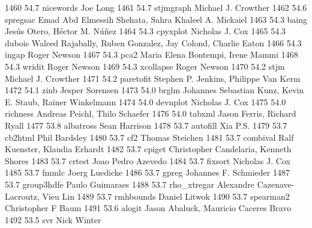   1460     54.7    nicewords     Joe Long                                
  1461     54.7    stjmgraph     Michael J. Crowther                     
  1462     54.6    spregsac      Emad Abd Elmessih Shehata, Sahra        
                                   Khaleel A. Mickaiel                     
  1463     54.3    baing         Jesús Otero, Héctor M. Núñez        
  1464     54.3    cpyxplot      Nicholas J. Cox                         
  1465     54.3    dubois        Waleed Rajabally, Ruben Gonzalez, Jay   
                                   Colond, Charlie Eaton                   
  1466     54.3    ingap         Roger Newson                            
  1467     54.3    pca2          Maria Elena Bontempi, Irene Mammi       
  1468     54.3    wridit        Roger Newson                            
  1469     54.3    xcollapse     Roger Newson                            
  1470     54.2    stjm          Michael J. Crowther                     
  1471     54.2    paretofit     Stephen P. Jenkins, Philippe Van Kerm   
  1472     54.1    zinb          Jesper Sorensen                         
  1473     54.0    brglm         Johannes Sebastian Kunz, Kevin E.       
                                   Staub, Rainer Winkelmann                
  1474     54.0    devnplot      Nicholas J. Cox                         
  1475     54.0    richness      Andreas Peichl, Thilo Schaefer          
  1476     54.0    tabxml        Jason Ferris, Richard Ryall             
  1477     53.8    albatross     Sean Harrison                           
  1478     53.7    autofill      Xia P.S.                                
  1479     53.7    cb2html       Phil Bardsley                           
  1480     53.7    cf2           Thomas Steichen                         
  1481     53.7    combival      Ralf Kuenster, Klaudia Erhardt          
  1482     53.7    cpiget        Christopher Candelaria, Kenneth Shores  
  1483     53.7    crtest        Joao Pedro Azevedo                      
  1484     53.7    fixsort       Nicholas J. Cox                         
  1485     53.7    fmmlc         Joerg Luedicke                          
  1486     53.7    gpreg         Johannes F. Schmieder                   
  1487     53.7    group3hdfe    Paulo Guimaraes                         
  1488     53.7    rho_xtregar   Alexandre Cazenave-Lacroutz, Vieu Lin   
  1489     53.7    rmhbounds     Daniel Litwok                           
  1490     53.7    spearman2     Christopher F Baum                      
  1491     53.6    alogit        Jason Abaluck, Mauricio Caceres Bravo   
  1492     53.5    svr           Nick Winter                             
